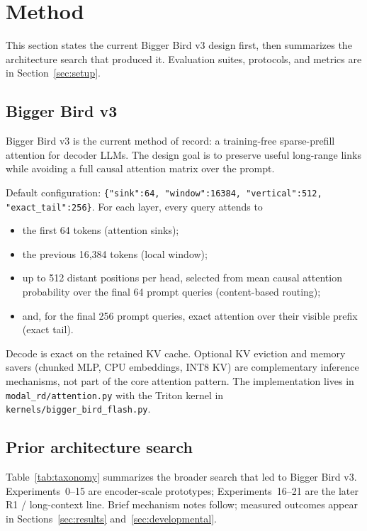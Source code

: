 \documentclass[11pt]{article}
\begin{document}
\section{Method}
\label{sec:methodology}
\label{sec:method}

This section states the current Bigger Bird v3 design first, then summarizes
the architecture search that produced it. Evaluation suites, protocols, and
metrics are in Section~\ref{sec:setup}.

\subsection{Bigger Bird v3}
\label{exp:bb-v3}
\label{sec:method-v3}

Bigger Bird v3 is the current method of record: a training-free sparse-prefill
attention for decoder LLMs. The design goal is to preserve useful long-range
links while avoiding a full causal attention matrix over the prompt.

Default configuration:
\texttt{\{"sink":64, "window":16384, "vertical":512, "exact\_tail":256\}}.
For each layer, every query attends to
\begin{itemize}
  \item the first 64 tokens (attention sinks);
  \item the previous 16{,}384 tokens (local window);
  \item up to 512 distant positions per head, selected from mean causal
    attention probability over the final 64 prompt queries (content-based
    routing);
  \item and, for the final 256 prompt queries, exact attention over their
    visible prefix (exact tail).
\end{itemize}
Decode is exact on the retained KV cache. Optional KV eviction and memory
savers (chunked MLP, CPU embeddings, INT8 KV) are complementary inference
mechanisms, not part of the core attention pattern. The implementation lives
in \texttt{modal\_rd/attention.py} with the Triton kernel in
\texttt{kernels/bigger\_bird\_flash.py}.


\subsection{Prior architecture search}
\label{sec:architectures}

Table~\ref{tab:taxonomy} summarizes the broader search that led to Bigger Bird
v3. Experiments~0--15 are encoder-scale prototypes; Experiments~16--21 are the
later R1 / long-context line. Brief mechanism notes follow; measured outcomes
appear in Sections~\ref{sec:results} and~\ref{sec:developmental}.
\end{document}
